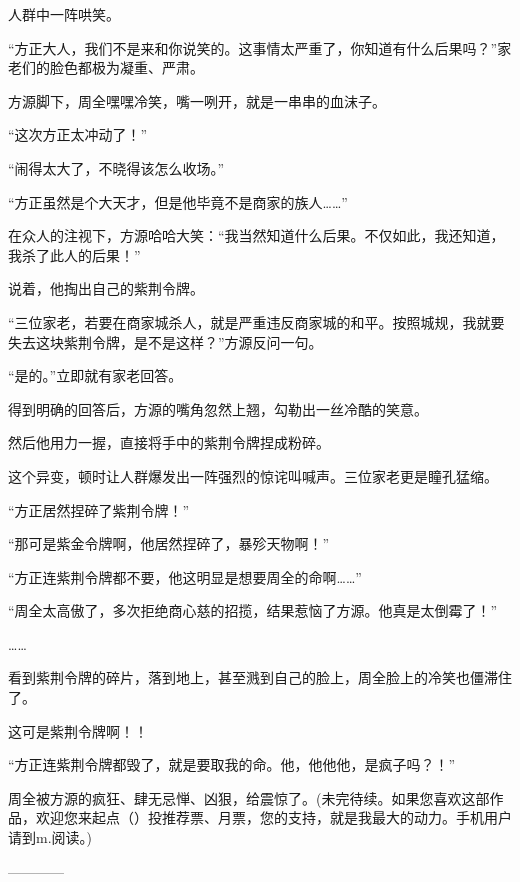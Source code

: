\begin{this_body}
人群中一阵哄笑。

“方正大人，我们不是来和你说笑的。这事情太严重了，你知道有什么后果吗？”家老们的脸色都极为凝重、严肃。

方源脚下，周全嘿嘿冷笑，嘴一咧开，就是一串串的血沫子。

“这次方正太冲动了！”

“闹得太大了，不晓得该怎么收场。”

“方正虽然是个大天才，但是他毕竟不是商家的族人……”

在众人的注视下，方源哈哈大笑：“我当然知道什么后果。不仅如此，我还知道，我杀了此人的后果！”

说着，他掏出自己的紫荆令牌。

“三位家老，若要在商家城杀人，就是严重违反商家城的和平。按照城规，我就要失去这块紫荆令牌，是不是这样？”方源反问一句。

“是的。”立即就有家老回答。

得到明确的回答后，方源的嘴角忽然上翘，勾勒出一丝冷酷的笑意。

然后他用力一握，直接将手中的紫荆令牌捏成粉碎。

这个异变，顿时让人群爆发出一阵强烈的惊诧叫喊声。三位家老更是瞳孔猛缩。

“方正居然捏碎了紫荆令牌！”

“那可是紫金令牌啊，他居然捏碎了，暴殄天物啊！”

“方正连紫荆令牌都不要，他这明显是想要周全的命啊……”

“周全太高傲了，多次拒绝商心慈的招揽，结果惹恼了方源。他真是太倒霉了！”

……

看到紫荆令牌的碎片，落到地上，甚至溅到自己的脸上，周全脸上的冷笑也僵滞住了。

这可是紫荆令牌啊！！

“方正连紫荆令牌都毁了，就是要取我的命。他，他他他，是疯子吗？！”

周全被方源的疯狂、肆无忌惮、凶狠，给震惊了。(未完待续。如果您喜欢这部作品，欢迎您来起点（）投推荐票、月票，您的支持，就是我最大的动力。手机用户请到m.阅读。)

------------

\end{this_body}

